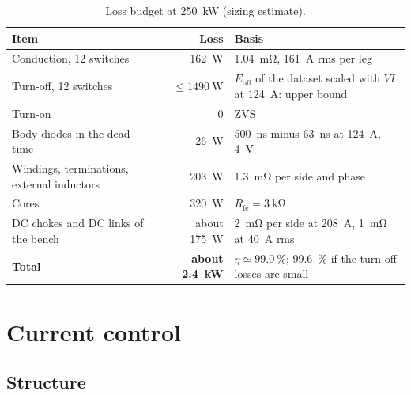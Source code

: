\documentclass[12pt,a4paper]{scrartcl}
\newcommand{\ped}[1]{_{\mathrm{#1}}}
\begin{document}
\begin{onehalfspace}
\begin{table}[H]
	\centering
	\captionsetup{width=0.9\textwidth, font=small}
	\caption{Loss budget at \SI{250}{\kilo\watt} (sizing estimate).}
	\label{tab:losses}
	\small
	\begin{tabularx}{0.9\textwidth}{@{} l r X @{}}
		\toprule
		\textbf{Item} & \textbf{Loss} & \textbf{Basis} \\
		\midrule
		Conduction, 12 switches & \SI{162}{\watt} & \SI{1.04}{\milli\ohm}, \SI{161}{\ampere} rms per leg \\
		Turn-off, 12 switches & $\le \SI{1490}{\watt}$ & $E\ped{off}$ of the dataset scaled with $V I$ at \SI{124}{\ampere}: upper bound \\
		Turn-on & 0 & ZVS \\
		Body diodes in the dead time & \SI{26}{\watt} & \SI{500}{\nano\second} minus \SI{63}{\nano\second} at \SI{124}{\ampere}, \SI{4}{\volt} \\
		Windings, terminations, external inductors & \SI{203}{\watt} & \SI{1.3}{\milli\ohm} per side and phase \\
		Cores & \SI{320}{\watt} & $R\ped{fe} = \SI{3}{\kilo\ohm}$ \\
		DC chokes and DC links of the bench & about \SI{175}{\watt} & \SI{2}{\milli\ohm} per side at \SI{208}{\ampere}, \SI{1}{\milli\ohm} at \SI{40}{\ampere} rms \\
		\midrule
		\textbf{Total} & \textbf{about \SI{2.4}{\kilo\watt}} & $\eta \simeq \SI{99.0}{\percent}$; \SI{99.6}{\percent} if the turn-off losses are small \\
		\bottomrule
	\end{tabularx}
\end{table}

\section{Current control}
\label{sec:control}

\subsection{Structure}
\label{sec:ctrl_structure}


\end{onehalfspace}
\end{document}
